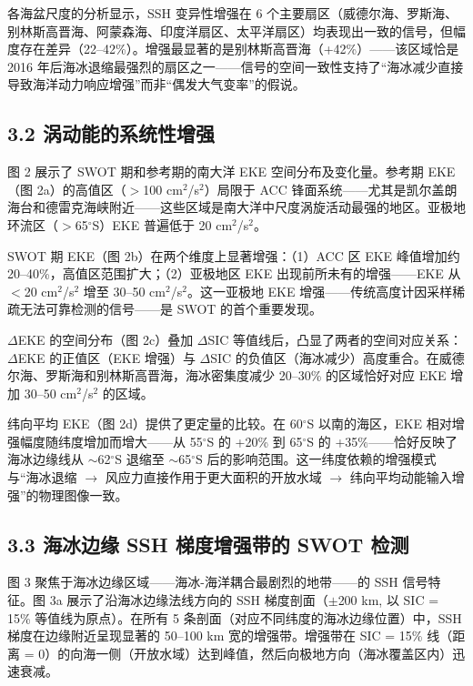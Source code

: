 \documentclass[11pt,a4paper]{article}
\begin{document}
各海盆尺度的分析显示，SSH 变异性增强在 6 个主要扇区（威德尔海、罗斯海、别林斯高晋海、阿蒙森海、印度洋扇区、太平洋扇区）均表现出一致的信号，但幅度存在差异（22--42\%）。增强最显著的是别林斯高晋海（+42\%）——该区域恰是 2016 年后海冰退缩最强烈的扇区之一——信号的空间一致性支持了``海冰减少直接导致海洋动力响应增强''而非``偶发大气变率''的假说。\par

\subsection*{3.2  涡动能的系统性增强}

图 2 展示了 SWOT 期和参考期的南大洋 EKE 空间分布及变化量。参考期 EKE（图 2a）的高值区（$>$100 cm$^2$/s$^2$）局限于 ACC 锋面系统——尤其是凯尔盖朗海台和德雷克海峡附近——这些区域是南大洋中尺度涡旋活动最强的地区。亚极地环流区（$>$65$^\circ$S）EKE 普遍低于 20 cm$^2$/s$^2$。\par

SWOT 期 EKE（图 2b）在两个维度上显著增强：（1）ACC 区 EKE 峰值增加约 20--40\%，高值区范围扩大；（2）亚极地区 EKE 出现前所未有的增强——EKE 从 $<$20 cm$^2$/s$^2$ 增至 30--50 cm$^2$/s$^2$。这一亚极地 EKE 增强——传统高度计因采样稀疏无法可靠检测的信号——是 SWOT 的首个重要发现。\par

$\Delta$EKE 的空间分布（图 2c）叠加 $\Delta$SIC 等值线后，凸显了两者的空间对应关系：$\Delta$EKE 的正值区（EKE 增强）与 $\Delta$SIC 的负值区（海冰减少）高度重合。在威德尔海、罗斯海和别林斯高晋海，海冰密集度减少 20--30\% 的区域恰好对应 EKE 增加 30--50 cm$^2$/s$^2$ 的区域。\par

纬向平均 EKE（图 2d）提供了更定量的比较。在 60$^\circ$S 以南的海区，EKE 相对增强幅度随纬度增加而增大——从 55$^\circ$S 的 +20\% 到 65$^\circ$S 的 +35\%——恰好反映了海冰边缘线从 $\sim$62$^\circ$S 退缩至 $\sim$65$^\circ$S 后的影响范围。这一纬度依赖的增强模式与``海冰退缩 $\to$ 风应力直接作用于更大面积的开放水域 $\to$ 纬向平均动能输入增强''的物理图像一致。\par

\subsection*{3.3  海冰边缘 SSH 梯度增强带的 SWOT 检测}

图 3 聚焦于海冰边缘区域——海冰-海洋耦合最剧烈的地带——的 SSH 信号特征。图 3a 展示了沿海冰边缘法线方向的 SSH 梯度剖面（$\pm$200 km, 以 SIC = 15\% 等值线为原点）。在所有 5 条剖面（对应不同纬度的海冰边缘位置）中，SSH 梯度在边缘附近呈现显著的 50--100 km 宽的增强带。增强带在 SIC = 15\% 线（距离 = 0）的向海一侧（开放水域）达到峰值，然后向极地方向（海冰覆盖区内）迅速衰减。\par
\end{document}
